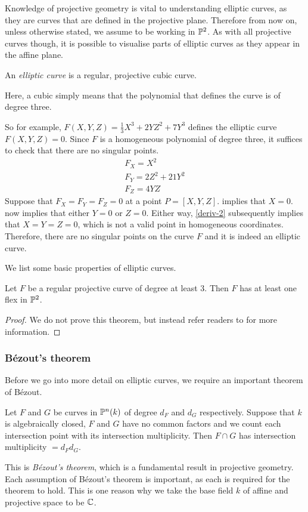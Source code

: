 Knowledge of projective geometry is vital to understanding elliptic curves, as they are curves that are defined in the projective plane.
Therefore from now on, unless otherwise stated, we assume to be working in $\pn[2]$.
As with all projective curves though, it is possible to visualise parts of elliptic curves as they appear in the affine plane.
\begin{definition}
	An \emph{elliptic curve} is a regular, projective cubic curve.
\end{definition}
Here, a cubic simply means that the polynomial that defines the curve is of degree three.

So for example, $F(X,Y,Z) = \frac{1}{3}X^3 + 2YZ^2 + 7Y^3$ defines the elliptic curve $F(X,Y,Z) = 0$.
Since $F$ is a homogeneous polynomial of degree three, it suffices to check that there are no singular points.
\begin{align}
	F_X = X^2 \label{deriv-1}\\
	F_Y = 2Z^2 + 21Y^2 \label{deriv-2}\\
	F_Z = 4YZ \label{deriv-3}
\end{align}
Suppose that $F_X = F_Y = F_Z = 0$ at a point $P = [X,Y,Z]$.
 implies that $X=0$.
 now implies that either $Y=0$ or $Z=0$.
Either way, \cref{deriv-2} subsequently implies that $X = Y = Z = 0$, which is not a valid point in homogeneous coordinates.
Therefore, there are no singular points on the curve $F$ and it is indeed an elliptic curve.

We list some basic properties of elliptic curves.
\begin{theorem}
	Let $F$ be a regular projective curve of degree at least 3.
	Then $F$ has at least one flex in $\pn[2]$.
	\label{flex-existence}
\end{theorem}
\begin{proof}
	We do not prove this theorem, but instead refer readers to \cite[§12]{bix2006} for more information.
\end{proof}
\subsubsection{Bézout's theorem}
Before we go into more detail on elliptic curves, we require an important theorem of Bézout.
\begin{theorem}
	Let $F$ and $G$ be curves in $\pn(k)$ of degree $d_F$ and $d_G$ respectively.
	Suppose that $k$ is algebraically closed, $F$ and $G$ have no common factors and we count each intersection point with its intersection multiplicity.
	Then $F \cap G$ has intersection multiplicity $= d_F d_G$.
	\label{bezouts-theorem}
\end{theorem}
This is \emph{Bézout's theorem}, which is a fundamental result in projective geometry.
Each assumption of Bézout's theorem is important, as each is required for the theorem to hold.
This is one reason why we take the base field $k$ of affine and projective space to be $\C$.
